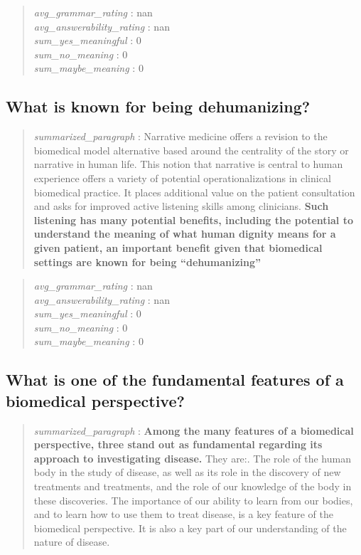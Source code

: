 \begin{quote}
\emph{avg\_grammar\_rating} : nan\\
\emph{avg\_answerability\_rating} : nan\\
\emph{sum\_yes\_meaningful} : 0\\
\emph{sum\_no\_meaning} : 0\\
\emph{sum\_maybe\_meaning} : 0
\end{quote}

\hypertarget{what-is-known-for-being-dehumanizing-1}{%
\subsection{What is known for being
dehumanizing?}\label{what-is-known-for-being-dehumanizing-1}}

\begin{quote}
\emph{summarized\_paragraph} : Narrative medicine offers a revision to
the biomedical model alternative based around the centrality of the
story or narrative in human life. This notion that narrative is central
to human experience offers a variety of potential operationalizations in
clinical biomedical practice. It places additional value on the patient
consultation and asks for improved active listening skills among
clinicians. \textbf{Such listening has many potential benefits,
including the potential to understand the meaning of what human dignity
means for a given patient, an important benefit given that biomedical
settings are known for being ``dehumanizing''}
\end{quote}

\begin{quote}
\emph{avg\_grammar\_rating} : nan\\
\emph{avg\_answerability\_rating} : nan\\
\emph{sum\_yes\_meaningful} : 0\\
\emph{sum\_no\_meaning} : 0\\
\emph{sum\_maybe\_meaning} : 0
\end{quote}

\hypertarget{what-is-one-of-the-fundamental-features-of-a-biomedical-perspective}{%
\subsection{What is one of the fundamental features of a biomedical
perspective?}\label{what-is-one-of-the-fundamental-features-of-a-biomedical-perspective}}

\begin{quote}
\emph{summarized\_paragraph} : \textbf{Among the many features of a
biomedical perspective, three stand out as fundamental regarding its
approach to investigating disease.} They are:. The role of the human
body in the study of disease, as well as its role in the discovery of
new treatments and treatments, and the role of our knowledge of the body
in these discoveries. The importance of our ability to learn from our
bodies, and to learn how to use them to treat disease, is a key feature
of the biomedical perspective. It is also a key part of our
understanding of the nature of disease.
\end{quote}

